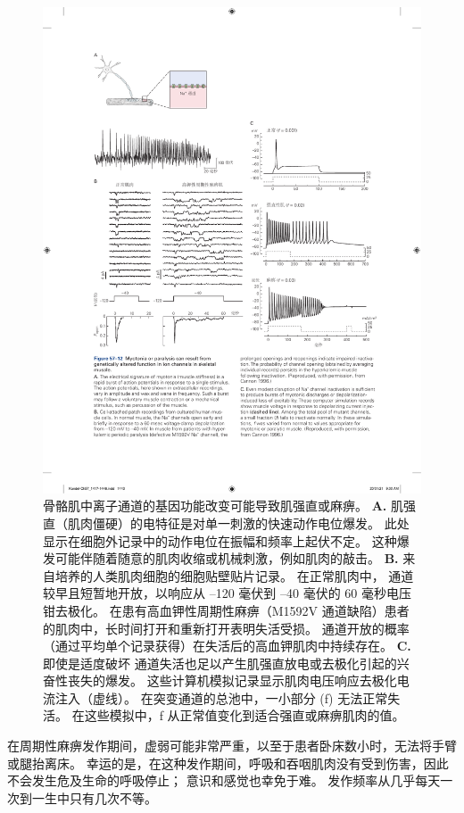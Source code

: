 \begin{figure}[htbp]
	\centering
	\includegraphics[width=0.95\linewidth]{chap57/fig_57_12}
	\caption{骨骼肌中离子通道的基因功能改变可能导致肌强直或麻痹。
		\textbf{A.} 肌强直（肌肉僵硬）的电特征是对单一刺激的快速动作电位爆发。
		此处显示在细胞外记录中的动作电位在振幅和频率上起伏不定。
		这种爆发可能伴随着随意的肌肉收缩或机械刺激，例如肌肉的敲击。
		\textbf{B.} 来自培养的人类肌肉细胞的细胞贴壁贴片记录。
		在正常肌肉中， 通道较早且短暂地开放，以响应从 –120 毫伏到 –40 毫伏的 60 毫秒电压钳去极化。
		在患有高血钾性周期性麻痹（M1592V  通道缺陷）患者的肌肉中，长时间打开和重新打开表明失活受损。
		通道开放的概率（通过平均单个记录获得）在失活后的高血钾肌肉中持续存在。
		\textbf{C.} 即使是适度破坏  通道失活也足以产生肌强直放电或去极化引起的兴奋性丧失的爆发。
		这些计算机模拟记录显示肌肉电压响应去极化电流注入（虚线）。
		在突变通道的总池中，一小部分 (f) 无法正常失活。
		在这些模拟中，f 从正常值变化到适合强直或麻痹肌肉的值。}
	\label{fig:57_12}
\end{figure}


在周期性麻痹发作期间，虚弱可能非常严重，以至于患者卧床数小时，无法将手臂或腿抬离床。
幸运的是，在这种发作期间，呼吸和吞咽肌肉没有受到伤害，因此不会发生危及生命的呼吸停止；
意识和感觉也幸免于难。
发作频率从几乎每天一次到一生中只有几次不等。


